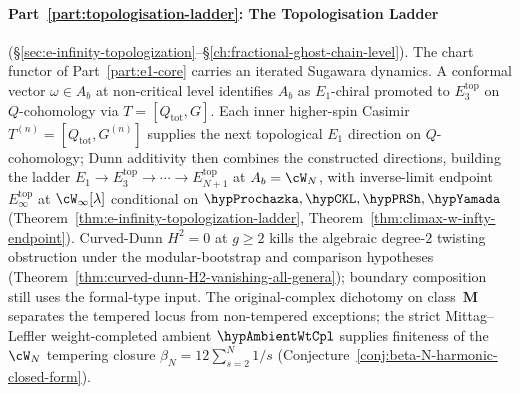 \paragraph{Part~\ref{part:topologisation-ladder}: The
Topologisation Ladder}
(\S\ref{sec:e-infinity-topologization}--\S\ref{ch:fractional-ghost-chain-level}).
The chart functor of Part~\ref{part:e1-core} carries an iterated
Sugawara dynamics. A conformal vector $\omega \in A_b$ at
non-critical level identifies $A_b$ as $E_1$-chiral promoted to
$E_3^{\mathrm{top}}$ on $Q$-cohomology via
$T = [Q_{\mathrm{tot}}, G]$. Each inner higher-spin Casimir
$T^{(n)} = [Q_{\mathrm{tot}}, G^{(n)}]$ supplies the next
topological $E_1$ direction on $Q$-cohomology; Dunn additivity
then combines the constructed directions, building the ladder
$E_1 \to E_3^{\mathrm{top}} \to \cdots \to E_{N+1}^{\mathrm{top}}$
at $A_b = \cW_N$, with inverse-limit endpoint
$E_\infty^{\mathrm{top}}$ at $\cW_\infty[\lambda]$ conditional on
$\hypProchazka, \hypCKL, \hypPRSh, \hypYamada$
(Theorem~\ref{thm:e-infinity-topologization-ladder},
Theorem~\ref{thm:climax-w-infty-endpoint}). Curved-Dunn
$H^2 = 0$ at $g \ge 2$ kills the algebraic degree-$2$ twisting
obstruction under the modular-bootstrap and comparison hypotheses
(Theorem~\ref{thm:curved-dunn-H2-vanishing-all-genera}); boundary
composition still uses the formal-type input. The original-complex
dichotomy on class~$\mathbf{M}$ separates the
tempered locus from non-tempered exceptions; the strict
Mittag--Leffler weight-completed ambient $\hypAmbientWtCpl$
supplies finiteness of the $\cW_N$ tempering closure
$\beta_N = 12 \sum_{s = 2}^N 1/s$
(Conjecture~\ref{conj:beta-N-harmonic-closed-form}).

